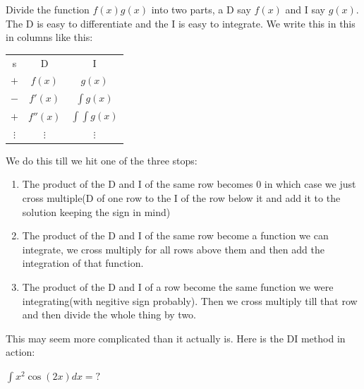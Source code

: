 \begin{theorem}
    Divide the function $f(x)g(x)$ into two parts, a D say $f(x)$ and I say $g(x)$. The D is easy to differentiate and the I is easy to integrate. We write this in this in columns like this:\\
    \begin{table} [H]
        \centering
        \begin{tabular}{c|c|c|}
            s & D & I\\
            $+$ & $f(x)$ & $g(x)$\\
            $-$ & $f'(x)$ & $\int g(x)$\\
            $+$ & $f''(x)$ & $\int \int g(x)$\\
            $\vdots$ & $\vdots$ & $\vdots$\\
        \end{tabular}
    \end{table}
    We do this till we hit one of the three stops:\\
    \begin{enumerate}
        \item The product of the D and I of the same row becomes $0$ in which case we just cross multiple(D of one row to the I of the row below it and add it to the solution keeping the sign in mind)\\
        \item The product of the D and I of the same row become a function we can integrate, we cross multiply for all rows above them and then add the integration of that function.\\
        \item The product of the D and I of a row become the same function we were integrating(with negitive sign probably). Then we cross multiply till that row and then divide the whole thing by two.
    \end{enumerate}
\end{theorem}
This may seem more complicated than it actually is. Here is the DI method in action:\\
\begin{example}
    $\int x^2 \cos(2x)dx=?$
\end{example}
